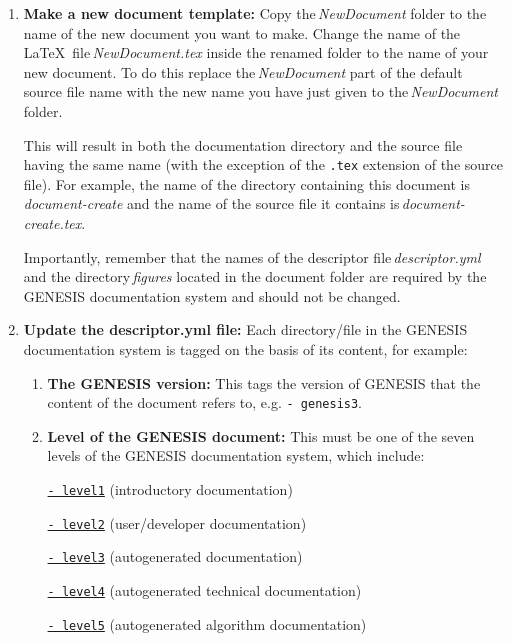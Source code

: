 \documentclass[12pt]{article}
\begin{document}
\begin{enumerate}

\item {\bf Make a new document template:} Copy the\,{\it NewDocument} folder to the name of the new document you want to make. Change the name of the \LaTeX\,\,\,file\,{\it NewDocument.tex} inside the renamed folder to the name of your new document. To do this replace the\,{\it NewDocument} part of the default source file name with the new name you have just given to the\,{\it NewDocument} folder.

This will result in both the documentation directory and the source file having the same name (with the exception of the {\tt .tex} extension of the source file). For example, the name of the directory containing this document is {\it document-create} and the name of the source file it contains is\,{\it document-create.tex}.

Importantly, remember that the names of the descriptor file\,{\it descriptor.yml} and the directory\,{\it figures} located in the document folder are required by the GENESIS documentation system and should not be changed.

\item {\bf Update the descriptor.yml file:} Each directory/file in the GENESIS documentation system is tagged on the basis of its content, for example:

\begin{enumerate}

\item  {\bf The GENESIS version:} This tags the version of GENESIS that the content of the document refers to, e.g. {\tt -\,genesis3}.

\item {\bf Level of the GENESIS document:} This must be one of the seven levels of the GENESIS documentation system, which include:

\href{../contents-level1/contents-level1.pdf}{{\tt - level1}} (introductory documentation)

\href{../contents-level2/contents-level2.pdf}{{\tt - level2}} (user/developer documentation)

\href{../contents-level3/contents-level3.pdf}{{\tt - level3}} (autogenerated documentation)

\href{../contents-level4/contents-level4.pdf}{{\tt - level4}} (autogenerated technical documentation)

\href{../contents-level5/contents-level5.pdf}{{\tt - level5}} (autogenerated algorithm documentation)


\end{enumerate}
\end{enumerate}
\end{document}
